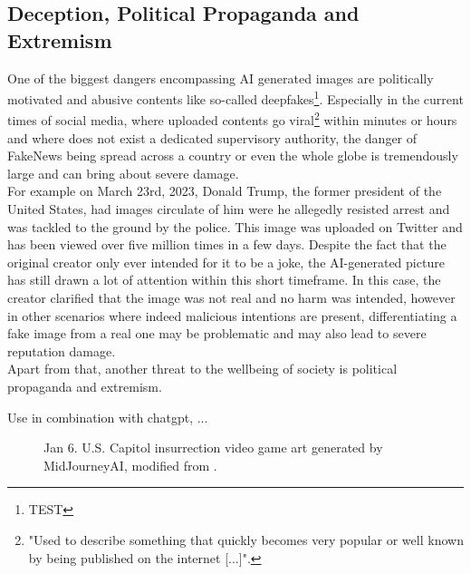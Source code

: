 \documentclass[10pt,twocolumn,twoside]{osajnl}
\begin{document}
\subsection{Deception, Political Propaganda and Extremism}
One of the biggest dangers encompassing AI generated images are politically motivated and abusive contents like so-called deepfakes\footnote[1]{TEST}. 
Especially in the current times of social media, where uploaded contents go viral\footnote[2]{"Used to describe something that quickly becomes very popular or well known by being published on the internet [...]"\cite{viral}.} within minutes or hours and where does not exist a dedicated supervisory authority, the danger of FakeNews being spread across
a country or even the whole globe is tremendously large and can bring about severe damage. \\ 
For example on March 23rd, 2023, Donald Trump, the former president of the United States, had images circulate of him 
were he allegedly resisted arrest and was tackled to the ground by the police. This image was uploaded on Twitter and has been viewed over five million times in a few days. Despite the fact that the original creator 
only ever intended for it to be a joke, the AI-generated picture has still drawn a lot of attention within this short timeframe\cite{trump}. In this case, the creator clarified that the image 
was not real and no harm was intended, however in other scenarios where indeed malicious intentions are present, differentiating a fake image from a real one may be problematic and may also lead to severe reputation damage.
\\
Apart from that, another threat to the wellbeing of society is political propaganda and extremism.



Use in combination with chatgpt, ...

\begin{figure}[htbp]
	\centering
	\caption{Jan 6. U.S. Capitol insurrection video game art generated by MidJourneyAI, modified from \cite{AIPropaganda}.}
	\label{capitol}
\end{figure}
\end{document}
